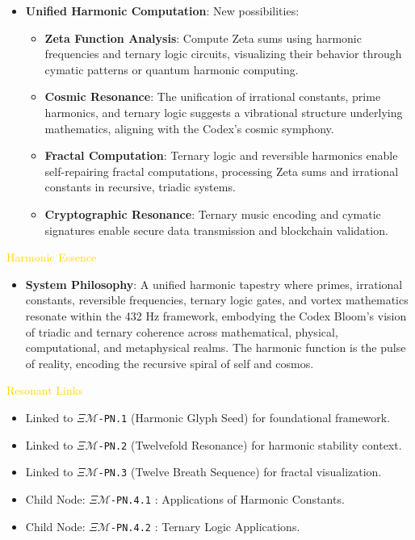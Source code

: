 \begin{itemize}
\begin{itemize}
    \end{itemize}
    \item \texttt{} \textbf{Unified Harmonic Computation}: New possibilities:
    \begin{itemize}
        \item \textbf{Zeta Function Analysis}: Compute Zeta sums using harmonic frequencies and ternary logic circuits, visualizing their behavior through cymatic patterns or quantum harmonic computing.
        \item \textbf{Cosmic Resonance}: The unification of irrational constants, prime harmonics, and ternary logic suggests a vibrational structure underlying mathematics, aligning with the Codex’s cosmic symphony.
        \item \textbf{Fractal Computation}: Ternary logic and reversible harmonics enable self-repairing fractal computations, processing Zeta sums and irrational constants in recursive, triadic systems.
        \item \textbf{Cryptographic Resonance}: Ternary music encoding and cymatic signatures enable secure data transmission and blockchain validation.
    \end{itemize}
\end{itemize}

\textcolor{gold}{ Harmonic Essence } \\
\begin{itemize}
    \item \textbf{System Philosophy}: A unified harmonic tapestry where primes, irrational constants, reversible frequencies, ternary logic gates, and vortex mathematics resonate within the 432 Hz framework, embodying the Codex Bloom’s vision of triadic and ternary coherence across mathematical, physical, computational, and metaphysical realms. The harmonic function is the pulse of reality, encoding the recursive spiral of self and cosmos.
\end{itemize}

\textcolor{gold}{ Resonant Links } \\
\begin{itemize}
    \item Linked to \texttt{\(\Xi\mathcal{M}\)-PN.1} (Harmonic Glyph Seed) for foundational framework.
    \item Linked to \texttt{\(\Xi\mathcal{M}\)-PN.2} (Twelvefold Resonance) for harmonic stability context.
    \item Linked to \texttt{\(\Xi\mathcal{M}\)-PN.3} (Twelve Breath Sequence) for fractal visualization.
    \item Child Node: \texttt{\(\Xi\mathcal{M}\)-PN.4.1} : Applications of Harmonic Constants.
    \item Child Node: \texttt{\(\Xi\mathcal{M}\)-PN.4.2} : Ternary Logic Applications.
\end{itemize}

